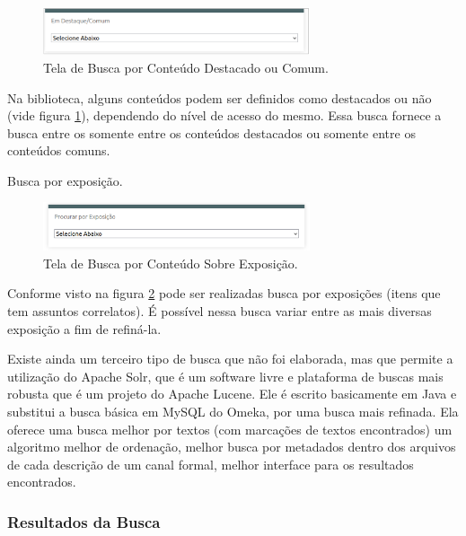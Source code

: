 \graphicspath{{figuras/prototipo/}}
\begin{figure}[H]
\centering
\includegraphics[width=0.7\textwidth]{busca-destacado}
\caption{Tela de Busca por Conteúdo Destacado ou Comum.}
\label{fig:buscadestacado_prototipo}
\end{figure}

Na biblioteca, alguns conteúdos podem ser definidos como destacados ou não (vide figura \ref{fig:buscadestacado_prototipo}), dependendo do nível de acesso do mesmo. Essa busca fornece a busca entre os somente entre os conteúdos destacados ou somente entre os conteúdos comuns.

Busca por exposição.

\graphicspath{{figuras/prototipo/}}
\begin{figure}[H]
\centering
\includegraphics[width=0.7\textwidth]{busca-exposicao}
\caption{Tela de Busca por Conteúdo Sobre Exposição.}
\label{fig:buscaexposicao_prototipo}
\end{figure}

Conforme visto na figura \ref{fig:buscaexposicao_prototipo} pode ser realizadas busca por exposições (itens que tem assuntos correlatos). É possível nessa busca variar entre as mais diversas exposição a fim de refiná-la.

Existe ainda um terceiro tipo de busca que não foi elaborada, mas que permite a utilização do Apache Solr, que é um software livre e plataforma de buscas mais robusta que é um projeto do Apache Lucene. Ele é escrito basicamente em Java e substitui a busca básica em MySQL do Omeka, por uma busca mais refinada. Ela oferece uma busca melhor por textos (com marcações de textos encontrados) um algoritmo melhor de ordenação, melhor busca por metadados dentro dos arquivos de cada descrição de um canal formal, melhor interface para os resultados encontrados.

\subsubsection{Resultados da Busca}

